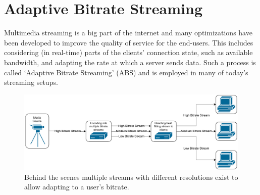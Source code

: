 \section{Adaptive Bitrate Streaming}\label{sec:adaptive_bitrate_streaming}
Multimedia streaming is a big part of the internet and many optimizations have
been developed to improve the quality of service for the end-users.
This includes considering (in real-time) parts of the clients' connection state, 
such as available bandwidth, and adapting the rate at which a server sends data.
Such a process is called `Adaptive Bitrate Streaming' (ABS) and is employed in many 
of today's streaming setups.

\begin{figure}[htbp] %
    \centering
    \includegraphics[width=\textwidth]{figures/02_background/adaptive-bitrate-streaming.drawio.pdf}
    \caption[Adaptive streaming schematic]{Behind the scenes multiple streams with different
    resolutions exist to allow adapting to a user's bitrate.}\label{fig:adaptive-bitrate-streaming}
\end{figure}
\vspace{1cm}

